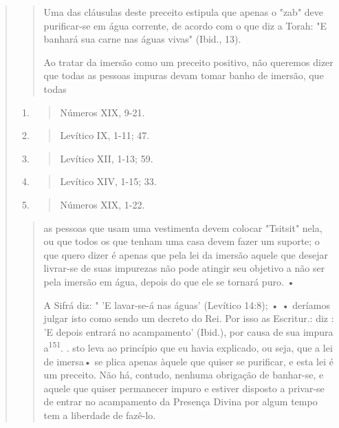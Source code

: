 \begin{quote}
\begin{quote}
Uma das cláusulas deste preceito estipula que apenas o "zab" deve
purificar-se em água corrente, de acordo com o que diz a Torah: "E
banhará sua carne nas águas vivas" (Ibid., 13).

Ao tratar da imersão como um preceito positivo, não queremos di­zer que
todas as pessoas impuras devam tomar banho de imersão, que todas
\end{quote}

\begin{enumerate}
\def\labelenumi{\arabic{enumi}.}
\setcounter{enumi}{145}
\item
 \begin{quote}
 Números XIX, 9-21.
 \end{quote}
\item
 \begin{quote}
 Levítico IX, 1-11; 47.
 \end{quote}
\item
 \begin{quote}
 Levítico XII, 1-13; 59.
 \end{quote}
\item
 \begin{quote}
 Levítico XIV, 1-15; 33.
 \end{quote}
\item
 \begin{quote}
 Números XIX, 1-22.
 \end{quote}
\end{enumerate}

\begin{quote}


as pessoas que usam uma vestimenta devem colocar "Tsitsit" nela, ou que
to­dos os que tenham uma casa devem fazer um suporte; o que quero dizer
é ape­nas que pela lei da imersão aquele que desejar livrar-se de suas
impurezas não pode atingir seu objetivo a não ser pela imersão em água,
depois do que ele se tornará puro. •

A Sifrá diz: " 'E lavar-se-á nas águas' (Levítico 14:8); • • deríamos
jul­gar isto como sendo um decreto do Rei. Por isso as Escritur.: diz :
'E depois entrará no acampamento' (Ibid.), por causa de sua impura
a\textsuperscript{151}. . sto leva ao princípio que eu
havia explicado, ou seja, que a lei de imersa• se plica apenas àquele
que quiser se purificar, e esta lei é um preceito. Não há, contudo,
ne­nhuma obrigação de banhar-se, e aquele que quiser permanecer impuro e
esti­ver disposto a privar-se de entrar no acampamento da Presença
Divina por al­gum tempo tem a liberdade de fazê-lo.


\end{quote}
\end{quote}
